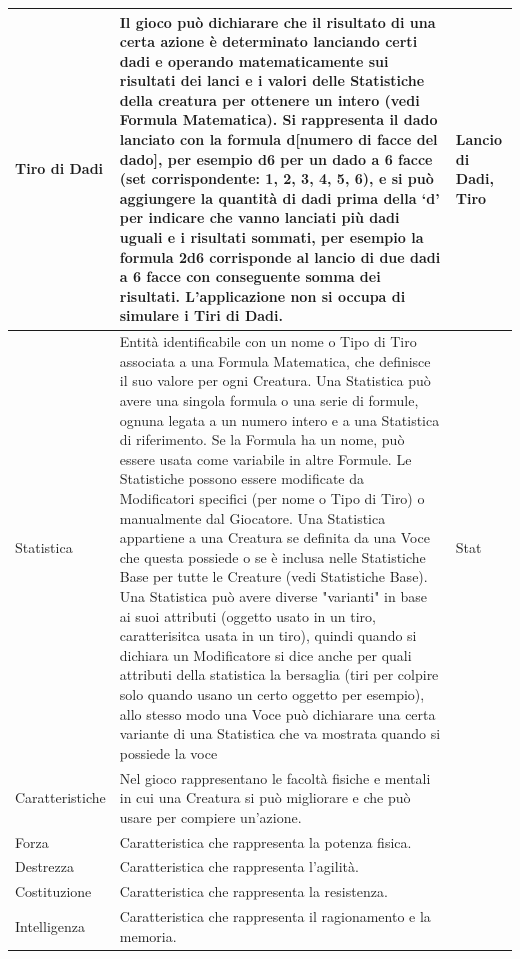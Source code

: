 \documentclass[a4paper, 11pt]{article}
\begin{document}
\begin{center}
\begin{longtable}{ |p{3.5cm}|p{9cm}|p{3cm}|  }
         Tiro di Dadi & Il gioco può dichiarare che il risultato di una certa azione è determinato lanciando certi dadi e operando matematicamente sui risultati dei lanci  e i valori delle Statistiche della creatura per ottenere un intero (vedi Formula Matematica). Si rappresenta il dado lanciato con la formula d[numero di facce del dado], per esempio d6 per un dado a 6 facce (set corrispondente: {1, 2, 3, 4, 5, 6}), e si può aggiungere la quantità di dadi prima della ‘d’ per indicare che vanno lanciati più dadi uguali e i risultati sommati, per esempio la formula 2d6 corrisponde al lancio di due dadi a 6 facce con conseguente somma dei risultati. L’applicazione non si occupa di simulare i Tiri di Dadi. & Lancio di Dadi, Tiro \\\hline
         Statistica & Entità identificabile con un nome o Tipo di Tiro associata a una Formula Matematica, che definisce il suo valore per ogni Creatura. Una Statistica può avere una singola formula o una serie di formule, ognuna legata a un numero intero e a una Statistica di riferimento. Se la Formula ha un nome, può essere usata come variabile in altre Formule. Le Statistiche possono essere modificate da Modificatori specifici (per nome o Tipo di Tiro) o manualmente dal Giocatore. Una Statistica appartiene a una Creatura se definita da una Voce che questa possiede o se è inclusa nelle Statistiche Base per tutte le Creature (vedi Statistiche Base). Una Statistica può avere diverse "varianti" in base ai suoi attributi (oggetto usato in un tiro, caratterisitca usata in un tiro), quindi quando si dichiara un Modificatore si dice anche per quali attributi della statistica la bersaglia (tiri per colpire solo quando usano un certo oggetto per esempio), allo stesso modo una Voce può dichiarare una certa variante di una Statistica che va mostrata quando si possiede la voce& Stat\\\hline
         Caratteristiche & Nel gioco rappresentano le facoltà fisiche e mentali in cui una Creatura si può migliorare e che può usare per compiere un’azione. & \\\hline
         Forza & Caratteristica che rappresenta la potenza fisica. & \\\hline
         Destrezza & Caratteristica che rappresenta l'agilità.&\\\hline
         Costituzione & Caratteristica che rappresenta la resistenza. &\\\hline
         Intelligenza & Caratteristica che rappresenta il ragionamento e la memoria. &\\\hline

\end{longtable}
\end{center}
\end{document}
